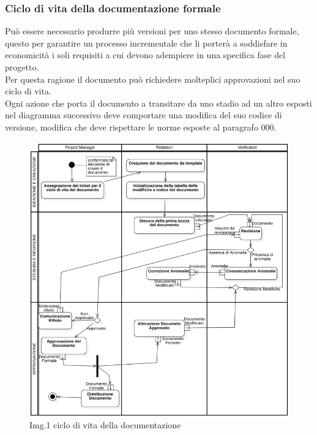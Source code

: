 		\subsubsection{Ciclo di vita della documentazione formale}
			Può essere necessario produrre più versioni per uno stesso documento formale, questo per garantire un processo incrementale che li porterà a soddisfare in economicità i soli requisiti a cui devono adempiere in una specifica fase del progetto.\\
			Per questa ragione il documento può richiedere molteplici approvazioni nel suo ciclo di vita.\\
			Ogni azione che porta il documento a transitare da uno stadio ad un altro esposti nel diagramma successivo deve comportare una modifica del suo codice di versione, modifica che deve rispettare le norme esposte al paragrafo 000.\\
			\begin{figure}[t!]
    				\centering
    				\includegraphics[width=1.0\textwidth]{res/images/ciclo_di_vita.png}
				\caption{Img.1 ciclo di vita della documentazione}
				\label{fig:Img.1 ciclo di vita della documentazione}
			\end{figure}
